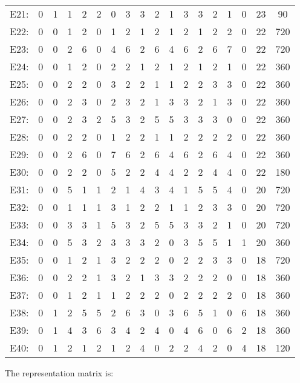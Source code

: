 \documentclass[12pt]{article}
\begin{document}
\begin{center}
\begin{tabular}{cccccccccccccccc|c|c}
E21:&0&1&1&2&2&0&3&3&2&1&3&3&2&1&0&23&90\\
E22:&0&0&1&2&0&1&2&1&2&1&2&1&2&2&0&22&720\\
E23:&0&0&2&6&0&4&6&2&6&4&6&2&6&7&0&22&720\\
E24:&0&0&1&2&0&2&2&1&2&1&2&1&2&1&0&22&360\\
E25:&0&0&2&2&0&3&2&2&1&1&2&2&3&3&0&22&360\\
E26:&0&0&2&3&0&2&3&2&1&3&3&2&1&3&0&22&360\\
E27:&0&0&2&3&2&5&3&2&5&5&3&3&3&0&0&22&360\\
E28:&0&0&2&2&0&1&2&2&1&1&2&2&2&2&0&22&360\\
E29:&0&0&2&6&0&7&6&2&6&4&6&2&6&4&0&22&360\\
E30:&0&0&2&2&0&5&2&2&4&4&2&2&4&4&0&22&180\\
E31:&0&0&5&1&1&2&1&4&3&4&1&5&5&4&0&20&720\\
E32:&0&0&1&1&1&3&1&2&2&1&1&2&3&3&0&20&720\\
E33:&0&0&3&3&1&5&3&2&5&5&3&3&2&1&0&20&720\\
E34:&0&0&5&3&2&3&3&3&2&0&3&5&5&1&1&20&360\\
E35:&0&0&1&2&1&3&2&2&2&0&2&2&3&3&0&18&720\\
E36:&0&0&2&2&1&3&2&1&3&3&2&2&2&0&0&18&360\\
E37:&0&0&1&2&1&1&2&2&2&0&2&2&2&2&0&18&360\\
E38:&0&1&2&5&5&2&6&3&0&3&6&5&1&0&6&18&360\\
E39:&0&1&4&3&6&3&4&2&4&0&4&6&0&6&2&18&360\\
E40:&0&1&2&1&2&1&2&4&0&2&2&4&2&0&4&18&120\\
\end{tabular}
\end{center}
The representation matrix is:
\end{document}
